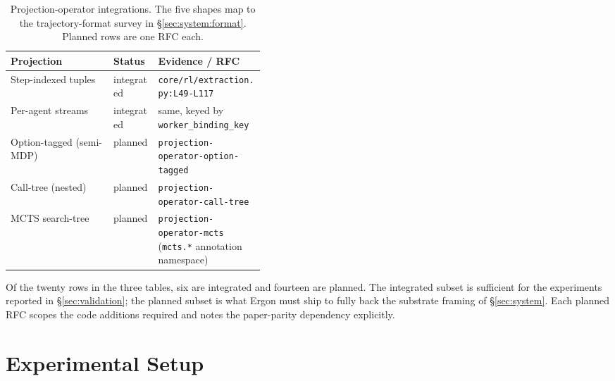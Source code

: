 \documentclass{article}
\begin{document}
\begin{table}[h]
\centering
\small
\setlength{\tabcolsep}{4pt}
\caption{Projection-operator integrations. The five shapes map
to the trajectory-format survey in \S\ref{sec:system:format}.
Planned rows are one RFC each.}
\label{tab:integrations:projections}
\begin{tabular}{@{}l l >{\raggedright\arraybackslash}p{0.42\linewidth}@{}}
\toprule
\textbf{Projection} & \textbf{Status} & \textbf{Evidence / RFC} \\
\midrule
Step-indexed tuples    & integrated & \texttt{core/rl/extraction.py:L49-L117} \\
Per-agent streams      & integrated & same, keyed by \texttt{worker\_binding\_key} \\
Option-tagged (semi-MDP) & planned  & \texttt{projection-operator-option-tagged} \\
Call-tree (nested)     & planned    & \texttt{projection-operator-call-tree} \\
MCTS search-tree       & planned    & \texttt{projection-operator-mcts} (\texttt{mcts.*} annotation namespace) \\
\bottomrule
\end{tabular}
\end{table}

Of the twenty rows in the three tables, six are integrated and
fourteen are planned. The integrated subset is sufficient for
the experiments reported in \S\ref{sec:validation}; the planned
subset is what Ergon must ship to fully back the substrate
framing of \S\ref{sec:system}. Each planned RFC scopes the
code additions required and notes the paper-parity dependency
explicitly.


\section{Experimental Setup}
\label{app:setup}
\end{document}
